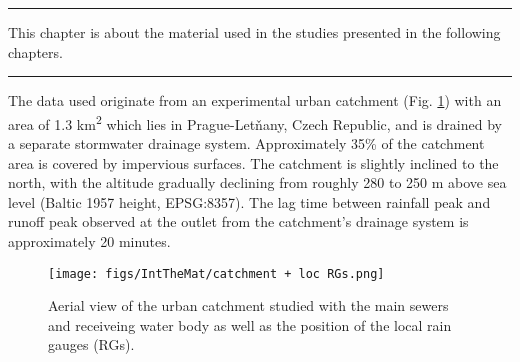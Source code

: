 \documentclass{ctuthesis}\usepackage[]{graphicx}\usepackage[]{color}
\begin{document}
\rule{\textwidth}{0.4pt}
This chapter is about the material used in the studies presented in the following chapters. \newline
\rule[0.2cm]{\textwidth}{0.4pt}


The data used originate from an experimental urban catchment (Fig. \ref{3fig1}) with an area of 1.3 km\textsuperscript{2} which lies in Prague-Letňany, Czech Republic, and is drained by a separate stormwater drainage system. Approximately 35\% of the catchment area is covered by impervious surfaces. The catchment is slightly inclined to the north, with the altitude gradually declining from roughly 280 to 250 m above sea level (Baltic 1957 height, EPSG:8357). The lag time between rainfall peak and runoff peak observed at the outlet from the catchment's drainage system is approximately 20 minutes.


\begin{figure}[H]
\begin{center}
\texttt{[image: figs/IntTheMat/catchment + loc RGs.png]}
\caption{Aerial view of the urban catchment studied with the main sewers and receiveing water body as well as the position of the local rain gauges (RGs).} \label{3fig1}
\end{center}
\end{figure}
\end{document}
